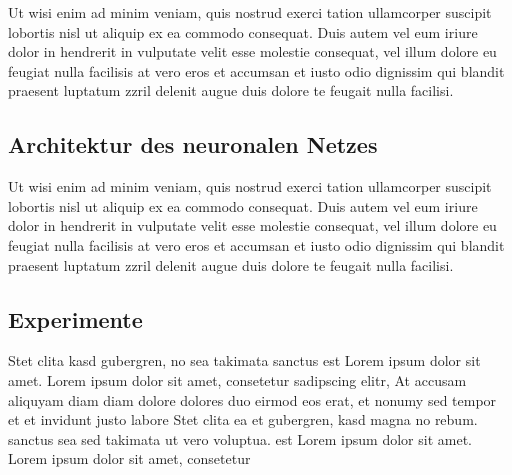 Ut wisi enim ad minim veniam, quis nostrud exerci tation ullamcorper suscipit lobortis nisl ut aliquip ex ea commodo consequat. Duis autem vel eum iriure dolor in hendrerit in vulputate velit esse molestie consequat, vel illum dolore eu feugiat nulla facilisis at vero eros et accumsan et iusto odio dignissim qui blandit praesent luptatum zzril delenit augue duis dolore te feugait nulla facilisi.


\subsection{Architektur des neuronalen Netzes}
\label{umsetzung_training_architektur}

Ut wisi enim ad minim veniam, quis nostrud exerci tation ullamcorper suscipit lobortis nisl ut aliquip ex ea commodo consequat. Duis autem vel eum iriure dolor in hendrerit in vulputate velit esse molestie consequat, vel illum dolore eu feugiat nulla facilisis at vero eros et accumsan et iusto odio dignissim qui blandit praesent luptatum zzril delenit augue duis dolore te feugait nulla facilisi.


\subsection{Experimente}
\label{umsetzung_training_experimente}

 Stet clita kasd gubergren, no sea takimata sanctus est Lorem ipsum dolor sit amet. Lorem ipsum dolor sit amet, consetetur sadipscing elitr, At accusam aliquyam diam diam dolore dolores duo eirmod eos erat, et nonumy sed tempor et et invidunt justo labore Stet clita ea et gubergren, kasd magna no rebum. sanctus sea sed takimata ut vero voluptua. est Lorem ipsum dolor sit amet. Lorem ipsum dolor sit amet, consetetur

 
 

